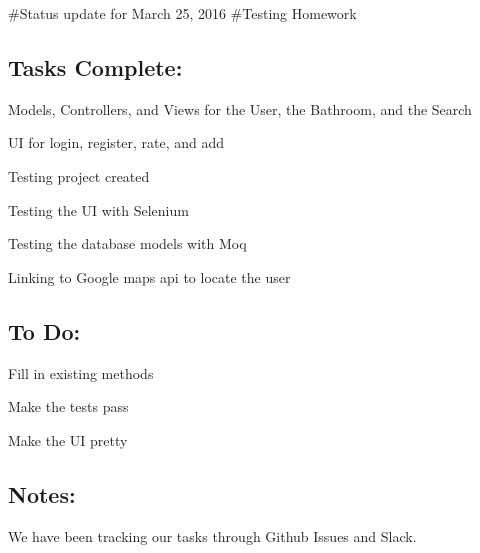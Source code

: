 \#\+Status update for March 25, 2016 \#\+Testing Homework

\subsection*{Tasks Complete\+:}


\begin{DoxyEnumerate}
\item Models, Controllers, and Views for the User, the Bathroom, and the Search
\item UI for login, register, rate, and add
\item Testing project created
\item Testing the UI with Selenium
\item Testing the database models with Moq
\item Linking to Google maps api to locate the user
\end{DoxyEnumerate}

\subsection*{To Do\+:}


\begin{DoxyEnumerate}
\item Fill in existing methods
\item Make the tests pass
\item Make the UI pretty
\end{DoxyEnumerate}

\subsection*{Notes\+:}

We have been tracking our tasks through Github Issues and Slack. 